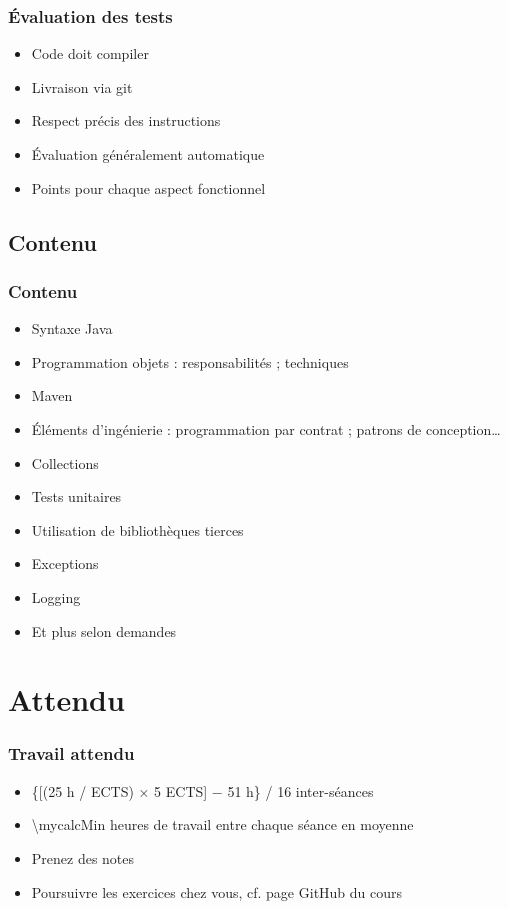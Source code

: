 \documentclass[english, french]{beamer}
\begin{document}
\begin{frame}
	\frametitle{Évaluation des tests}
	\begin{itemize}
		\item Code doit compiler
		\item Livraison via git
		\item Respect précis des instructions
		\item Évaluation généralement automatique
		\item Points pour chaque aspect fonctionnel
	\end{itemize}
\end{frame}

\subsection{Contenu}
\begin{frame}
	\frametitle{Contenu}
	\begin{itemize}
		\item Syntaxe Java
		\item Programmation objets : responsabilités ; techniques
		\item Maven
		\item Éléments d’ingénierie : programmation par contrat ; patrons de conception…
		\item Collections
		\item Tests unitaires
		\item Utilisation de bibliothèques tierces
		\item Exceptions
		\item Logging
		\item Et plus selon demandes
	\end{itemize}
\end{frame}

\section{Attendu}
\begin{frame}
	\frametitle{Travail attendu}
	\begin{itemize}
		\item \{[(25 h / ECTS) × 5 ECTS] − 51 h\} / 16 inter-séances
		\item \num[round-mode=places, round-precision=0, mode=text]{\mycalcMin} heures de travail entre chaque séance en moyenne
		\item Prenez des notes
		\item Poursuivre les exercices chez vous, cf. page GitHub du cours
	\end{itemize}
\end{frame}
\end{document}
